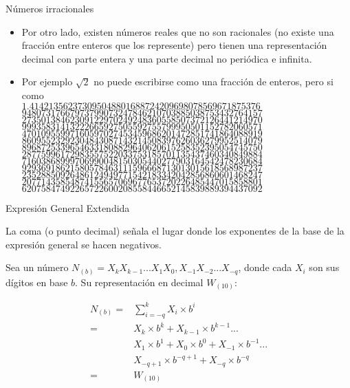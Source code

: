 \documentclass[11pt,a4paper,spanish]{beamer}
\begin{document}
\begin{frame}{Números irracionales}
\begin{itemize}
    \item Por otro lado, existen números reales que no son racionales (no
        existe una fracción entre enteros que los represente) pero tienen una
        representación decimal con parte entera y una parte decimal no
        periódica e infinita.\pause
    \item Por ejemplo $\sqrt{2}$ no puede escribirse como una fracción de
        enteros, pero si como\\ \pause
        $1.414213562373095048801688724209698078569671875376$\\
        $94807317667973799073247846210703885038753432764157$\\
        $27350138462309122970249248360558507372126441214970$\\
        $99935831413222665927505592755799950501152782060571$\\
        $47010955997160597027453459686201472851741864088919$\\
        $86095523292304843087143214508397626036279952514079$\\
        $89687253396546331808829640620615258352395054745750$\\
        $28775996172983557522033753185701135437460340849884$\\
        $71603868999706990048150305440277903164542478230684$\\
        $92936918621580578463111596668713013015618568987237$\\
        $23528850926486124949771542183342042856860601468247$\\
        $20771435854874155657069677653720226485447015858801$\\
        $62075847492265722600208558446652145839889394437092$\\
\end{itemize}
\end{frame}

\begin{frame}{Expresión General Extendida}

    La coma (o punto decimal) señala el lugar donde los exponentes de la base de la expresión general se
    hacen negativos.

    Sea un número $N_{(b)} = X_{k}X_{k-1}...X_{1}X_{0},X_{-1}X_{-2}...X_{-q}$, donde cada $X_{i}$ son sus
    dígitos en base $b$. Su representación en decimal $W_{(10)}$:

\begin{equation*}
\begin{aligned}
    N_{(b)} = &\sum_{i=-q}^{k} X_{i}{\times}b^{i}\\
    = &X_{k}{\times}b^{k}+X_{k-1}{\times}b^{k-1}...\\
    &X_{1}{\times}b^{1}+X_{0}{\times}b^{0}+X_{-1}{\times}b^{-1}...\\
    &X_{-q+1}{\times}b^{-q+1}+X_{-q}{\times}b^{-q}\\
    = &W_{(10)}\\
\end{aligned}
\end{equation*}
\end{frame}
\end{document}
